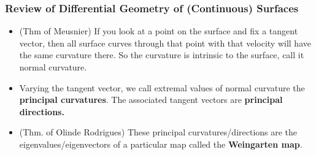 \documentclass[9pt,notes]{beamer}
\begin{document}
\begin{frame}
\frametitle{Review of Differential Geometry of (Continuous) Surfaces}
  \begin{itemize}
    \item (Thm of Meusnier)
          If you look at a point on the surface and fix a tangent vector,
          then all surface curves through that point with that velocity
          will have the same curvature there.
          So the curvature is intrinsic to the surface, call it normal curvature.
    \item Varying the tangent vector,
          we call extremal values of normal curvature the
          \textbf{principal curvatures}.
          The associated tangent vectors are \textbf{principal directions.}
    \item (Thm. of Olinde Rodrigues)
          These principal curvatures/directions are
          the eigenvalues/eigenvectors of
          a particular map called the \textbf{Weingarten map}.
  \end{itemize}
\end{frame}
\end{document}
